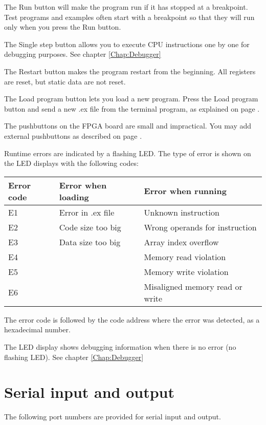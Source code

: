 \documentclass[11pt,a4paper,oneside,openright]{report}
\newcommand{\vv}{ \vspace{2mm} }   %
\begin{document}
The Run button will make the program run if it has stopped at a breakpoint. Test programs and examples often start with a breakpoint so that they will run only when you press the Run button.
\vv

The Single step button allows you to execute CPU instructions one by one for debugging purposes. See chapter \ref{Chap:Debugger}
\vv

The Restart button makes the program restart from the beginning. All registers are reset, but static data are not reset.
\vv

The Load program button lets you load a new program. Press the Load program button and send a new .ex file from the terminal program, as explained on page \pageref{Chap:GettingStarted}.
\vv

The pushbuttons on the FPGA board are small and impractical. You may add external pushbuttons as described on page \pageref{Chap:ExternalPushbuttons}.
\vv

Runtime errors are indicated by a flashing LED. The type of error is shown on the LED displays with the following codes:
\vv

\begin{tabular}{|l|l|l|} 
\hline
\bfseries Error code  & \bfseries Error when loading & \bfseries Error when running  \\ \hline
E1  & Error in .ex file & Unknown instruction \\ \hline
E2  & Code size too big & Wrong operands for instruction \\ \hline
E3  & Data size too big & Array index overflow \\ \hline
E4  &  & Memory read violation \\ \hline
E5  &  & Memory write violation \\ \hline
E6  &  & Misaligned memory read or write \\ \hline
\end{tabular}
\vv

The error code is followed by the code address where the error was detected, as a hexadecimal number.
\vv

The LED display shows debugging information when there is no error (no flashing LED). See chapter \ref{Chap:Debugger}
\vv

\chapter{Serial input and output} \label{Chap:SerialIO}

The following port numbers are provided for serial input and output.
\vv
\end{document}
